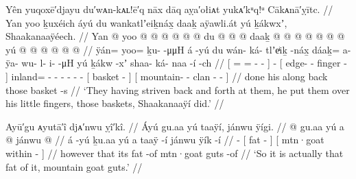 \ex\label{ex:92-205-put-over-little-finger}%
%
\begingl
	\glpreamble	Yên yuqoxē′djayu du′wᴀn-kᴀʟ!ē′q nāx dāq aỵa′ołiᴀt yukᴀ′kᵘq!ᵘ Cākᴀnā′ỵītc. //
	\glpreamble	Yan yoo ḵuxéich áyú du wankatlʼeiḵnáx̱ daaḵ aÿawli.át yú ḵákwxʼ, Shaakanaaÿéech. //
	\gla	{} Yan @ yoo @  @ {} @ {} @ {} @ {} {}  @ {}
		{} du  @ {} @ {} @ {} {}
		daaḵ @  @ {} @ {} @ {} @ {} @ {} @ {}
		{} yú  @ {} {}
		{}  @ {} @ {} @ {} @ {} @ {} //
	\glb	{} ÿán= yoo= ḵu- {}  -μμH {} {} á -yú
		{} du wán- ká- tlʼeͥiḵ -náx̱ {}
		dáaḵ= a- ÿa- wu- l- i-  -μH
		{} yú ḵákw -xʼ {}
		{} shaa- ká- naa -í -ch {} //
	\glc	{}[ = = - \·  - \· {}]  -
		{}[  edge- - finger - {}]
		inland= - - - - -  -
		{}[  basket - {}]
		{}[ mountain- - clan - - {}] //
	\gld	{} done   {} {} {} {} {}  {}
		{} his  {} {} \·along {}
		back  {} {} {} {} {} {}
		{} those basket -s {}
		{}  {} {} {} {} {} //
	\glft	‘They having striven back and forth at them, he put them over his little fingers, those baskets, Shaakanaaÿí did.’
		//
\endgl
\xe


\ex\label{ex:92-206-mountain-goat-fat}%
%
\begingl
	\glpreamble	Ayū′gu ᴀyutā′î djᴀ′nwu ỵî′kî. //
	\glpreamble	Áyú gu.aa yú taaÿí, jánwu ÿígi. //
	\gla	{} @ {} gu.aa {} yú a  @ {} {}
		{} jánwu  @ {} {} //
	\glb	á -yú ḵu.aa {} yú a taaÿ -í {}
		{} jánwu ÿík -í {} //
	\glc	{} - 
		{}[   fat - {}]
		{}[ mtn·goat within - {}] //
	\gld	{} {} however {} that its fat -of {}
		{} mtn·goat guts -of {} //
	\glft	‘So it is actually that fat of it, mountain goat guts.’
		//
\endgl
\xe


